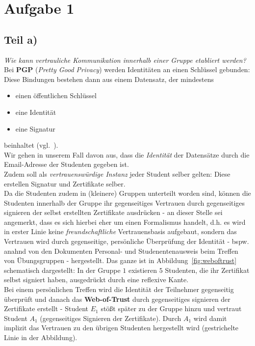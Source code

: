 \chapter{Aufgabe 1}

\section{Teil a)}

\textit{Wie kann vertrauliche Kommunikation innerhalb einer Gruppe etabliert werden?}\\

\noindent
Bei \textbf{PGP} (\textit{Pretty Good Privacy}) werden Identitäten an einen Schlüssel gebunden: Diese Bindungen bestehen dann aus einem Datensatz, der mindestens

\begin{itemize}
    \itemsep0.5em
    \item einen öffentlichen Schlüssel
    \item eine Identität
    \item eine Signatur
\end{itemize}

\noindent
beinhaltet (vgl.~\cite[43]{ITS6}).\\

\noindent
Wir gehen in unserem Fall davon aus, dass die \textit{Identität} der Datensätze durch die Email-Adresse der Studenten gegeben ist.\\

\noindent
Zudem soll als \textit{vertrauenswürdige Instanz} jeder Student selber gelten: Diese erstellen Signatur und Zertifikate selber.\\
Da die Studenten zudem in (kleinere) Gruppen unterteilt worden sind, können die Studenten innerhalb der Gruppe ihr gegenseitiges Vertrauen durch gegenseitiges signieren der selbst erstellten Zertifikate ausdrücken - an dieser Stelle sei angemerkt, dass es sich hierbei eher um einen Formalismus handelt, d.h. es wird in erster Linie keine \textit{freundschaftliche} Vertrauensbasis aufgebaut, sondern das Vertrauen wird durch gegenseitige, persönliche Überprüfung der Identität - bspw. anahnd von den Dokumenten Personal- und Studenentenausweis beim Treffen von Übungsgruppen - hergestellt.
Das ganze ist in Abbildung~\ref{fig:weboftrust} schematisch dargestellt: In der Gruppe $1$ existieren $5$ Studenten, die ihr Zertifikat selbst signiert haben, ausgedrückt durch eine reflexive Kante. \\
Bei einem persönlichen Treffen wird die Identität der Teilnehmer gegenseitig überprüft und danach das \textbf{Web-of-Trust} durch gegenseitiges signieren der Zertifikate erstellt - Student $E_1$ stößt später zu der Gruppe hinzu und vertraut Student $A_1$ (gegenseitiges Signieren der Zertifikate).
Durch $A_1$ wird damit  implizit das Vertrauen zu den übrigen Studenten hergestellt wird (gestrichelte Linie in der Abbildung).\\


